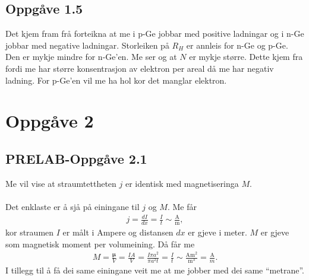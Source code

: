 \documentclass[11pt, a4paper]{article}
\newcommand{\vb}{\mathbf}
\begin{document}
  \subsection*{Oppgåve 1.5}
    Det kjem fram frå forteikna at me i p-Ge jobbar med positive ladningar og i n-Ge jobbar med negative ladningar. Storleiken på $R_{H}$ er annleis for n-Ge og p-Ge.
    Den er mykje mindre for n-Ge'en. Me ser og at $N$ er mykje større. Dette kjem fra fordi me har større konsentrasjon av elektron per areal då me har negativ ladning. For
    p-Ge'en vil me ha hol kor det manglar elektron.


\newpage


\section*{Oppgåve 2}

  \subsection*{PRELAB-Oppgåve 2.1}
    Me vil vise at straumtettheten $j$ er identisk med magnetiseringa $M$. \\ \\
    Det enklaste er å sjå på einingane til $j$ og $M$. Me får
    \begin{align*}
      j = \frac{dI}{dx} = \frac{I}{t} \sim \frac{\text{A}}{\text{m}},
    \end{align*}
    kor straumen $I$ er målt i Ampere og distansen $dx$ er gjeve i meter. $M$ er gjeve som magnetisk moment per volumeining. Då får me
    \begin{align*}
      M = \frac{\vb{\mu}}{V} = \frac{IA}{V} = \frac{I\pi a^2}{\pi a^2t} = \frac{I}{t} \sim \frac{\text{A}\text{m}^2}{\text{m}^3} = \frac{\text{A}}{{m}}.
    \end{align*}
    I tillegg til å få dei same einingane veit me at me jobber med dei same ``metrane''.
\end{document}
